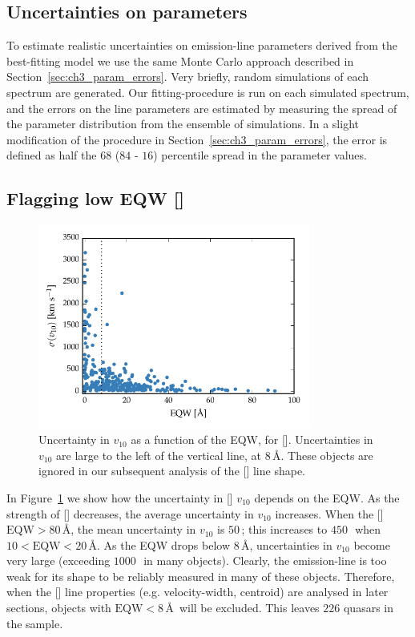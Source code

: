 \subsection{Uncertainties on parameters}

To estimate realistic uncertainties on emission-line parameters derived from the best-fitting model we use the same Monte Carlo approach described in Section~\ref{sec:ch3_param_errors}.
Very briefly, random simulations of each spectrum are generated.
Our fitting-procedure is run on each simulated spectrum, and the errors on the line parameters are estimated by measuring the spread of the parameter distribution from the ensemble of simulations.
In a slight modification of the procedure in Section~\ref{sec:ch3_param_errors}, the error is defined as half the $68$ ($84$ - $16$) percentile spread in the parameter values.

\subsection{Flagging low EQW []}
\label{sec:ch4-loweqw}

\begin{figure}
    \centering
    \includegraphics[width=0.8\textwidth]{figures/chapter04/eqw_cut.pdf}
    \caption[{Uncertainty in $v_{10}$ as a function of the EQW.}]{Uncertainty in $v_{10}$ as a function of the EQW, for []. Uncertainties in $v_{10}$ are large to the left of the vertical line, at $8$\,\AA. These objects are ignored in our subsequent analysis of the [] line shape.}
    \label{fig:eqw_cut}
\end{figure}

In Figure~\ref{fig:eqw_cut} we show how the uncertainty in [] $v_{10}$ depends on the EQW.
As the strength of [] decreases, the average uncertainty in $v_{10}$ increases.
When the [] $\text{EQW} > 80$\,\AA, the mean uncertainty in $v_{10}$ is $50$\,\kms; this increases to $450$\,\kms\, when $10 < \text{EQW} < 20$\,\AA.
As the EQW drops below $8$\,\AA, uncertainties in $v_{10}$ become very large (exceeding $1000$\,\kms\, in many objects).
Clearly, the emission-line is too weak for its shape to be reliably measured in many of these objects.
Therefore, when the [] line properties (e.g. velocity-width, centroid) are analysed in later sections, objects with $\text{EQW} < 8$\,\AA\, will be excluded.
This leaves $226$ quasars in the sample.

